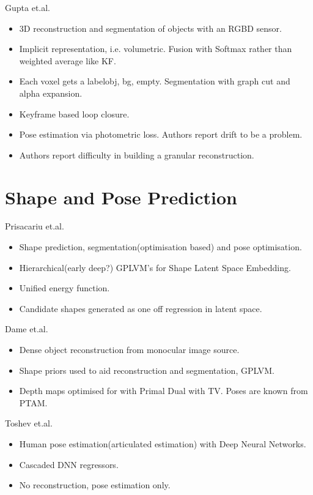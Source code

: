 Gupta et.al. \cite{Gupta2016}
\begin{itemize}
	\item 3D reconstruction and segmentation of objects with an RGBD sensor.
	\item Implicit representation, i.e. volumetric. Fusion with Softmax rather than weighted average like KF.
	\item Each voxel gets a label{obj, bg, empty}. Segmentation with graph cut and alpha expansion.
	\item Keyframe based loop closure.
	\item Pose estimation via photometric loss. Authors report drift to be a problem.
	\item Authors report difficulty in building a granular reconstruction.
\end{itemize}

\section{Shape and Pose Prediction}
\label{sec:lit_review_prediction}

Prisacariu et.al. \cite{Prisacariu2011}
\begin{itemize}
	\item Shape prediction, segmentation(optimisation based) and pose optimisation.
	\item Hierarchical(early deep?) GPLVM's for Shape Latent Space Embedding. \cite{Lawrence2005}
	\item Unified energy function.
	\item Candidate shapes generated as one off regression in latent space.
\end{itemize}

Dame et.al. \cite{Dame2013}
\begin{itemize}
	\item Dense object reconstruction from monocular image source.
	\item Shape priors used to aid reconstruction and segmentation, GPLVM.
	\item Depth maps optimised for with Primal Dual with TV. Poses are known from PTAM.
\end{itemize}

Toshev et.al. \cite{Toshev2014}
\begin{itemize}
	\item Human pose estimation(articulated estimation) with Deep Neural Networks.
	\item Cascaded DNN regressors.
	\item No reconstruction, pose estimation only.
\end{itemize}

